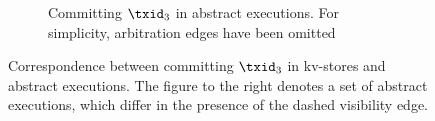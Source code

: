 \begin{figure}[t]
\begin{subfigure}{0.95\textwidth}





\caption{Committing \( \txid_3 \) in abstract executions. For simplicity, arbitration edges have been omitted}
\label{fig:et-sound-aexec-update}
\end{subfigure}

\hrulefill

\caption{Correspondence between committing \( \txid_3 \) in kv-stores and abstract executions. 
The figure to the right denotes a set of abstract executions, which differ in the presence of the dashed visibility edge.}
\label{fig:et-sound-to-aexec}
\end{figure}
